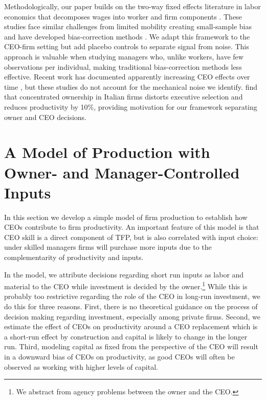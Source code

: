 \documentclass[11pt,a4paper]{article}
\begin{document}
Methodologically, our paper builds on the two-way fixed effects literature in labor economics that decomposes wages into worker and firm components \citep{Abowd1999Econometrica, Card2018JoLE}. These studies face similar challenges from limited mobility creating small-sample bias \citep{andrews2008high} and have developed bias-correction methods \citep{Bonhomme2023-dx, gaure2014correlation}. We adapt this framework to the CEO-firm setting but add placebo controls to separate signal from noise. This approach is valuable when studying managers who, unlike workers, have few observations per individual, making traditional bias-correction methods less effective. Recent work has documented apparently increasing CEO effects over time \citep{quigley2015has}, but these studies do not account for the mechanical noise we identify. \citet{lippi2014corporate} find that concentrated ownership in Italian firms distorts executive selection and reduces productivity by 10\%, providing motivation for our framework separating owner and CEO decisions.

\section{A Model of Production with Owner- and Manager-Controlled Inputs}

In this section we develop a simple model of firm production to establish how CEOs contribute to firm productivity. An important feature of this model is that CEO skill is a direct component of TFP, but is also correlated with input choice: under skilled managers firms will purchase more inputs due to the complementarity of productivity and inputs. 

In the model, we attribute decisions regarding short run inputs as labor and material to the CEO while investment is decided by the owner.\footnote{We abstract from agency problems between the owner and the CEO.} While this is probably too restrictive regarding the role of the CEO in long-run investment, we do this for three reasons. First, there is no theoretical guidance on the process of decision making regarding investment, especially among private firms. Second, we estimate the effect of CEOs on productivity around a CEO replacement which is a short-run effect by construction and capital is likely to change in the longer run. Third, modeling capital as fixed from the perspective of the CEO will result in a downward bias of CEOs on productivity, as good CEOs will often be observed as working with higher levels of capital. 
\end{document}
